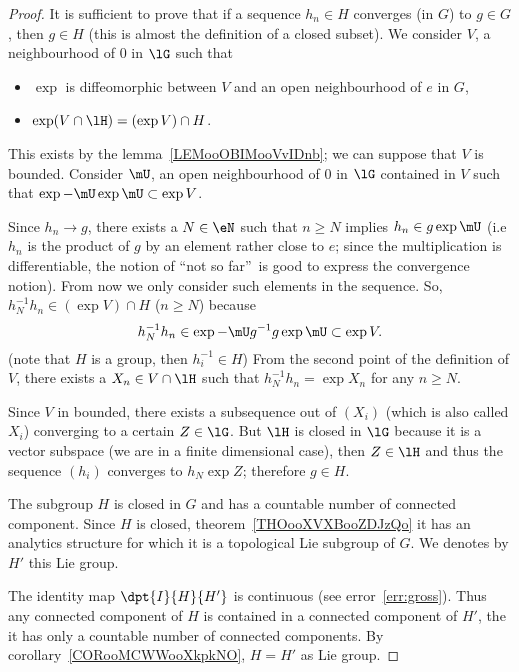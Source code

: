 \begin{proof}
	 It is sufficient to prove that if a sequence $h_n\in H$ converges (in $G$) to $g\in G$, then $g\in H$ (this is almost the definition of a closed subset). We consider $V$, a neighbourhood of $0$ in $\lG$ such that

	\begin{itemize}
		\item $\exp$ is diffeomorphic between $V$ and an open neighbourhood  of $e$ in $G$,
		\item $\exp(V\cap \lH)=(\exp V)\cap H$.
	\end{itemize}
	This exists by the lemma~\ref{LEMooOBIMooVvIDnb}; we can suppose that $V$ is bounded. Consider $\mU$, an open neighbourhood of $0$ in $\lG$ contained in $V$ such that $\exp-\mU\exp\mU\subset\exp V$.

	Since $h_n\to g$, there exists a $N\in\eN$ such that $n\geq N$ implies $h_n\in g\exp\mU$ (i.e $h_n$ is the product of $g$ by an element rather close to $e$; since the multiplication is differentiable, the notion of ``not so far''\ is good to express the convergence notion). From now we only consider such elements in the sequence. So, $h_N^{-1} h_n\in(\exp V)\cap H$ ($n\geq N$) because
	\[
		h_N^{-1} h_n\in\exp-\mU g^{-1} g\exp\mU\subset\exp V.
	\]
	(note that $H$ is a group, then $h_i^{-1}\in H$) From the second point of the definition of $V$, there exists a $X_n\in V\cap\lH$ such that $h^{-1}_N h_n=\exp X_n$ for any $n\geq N$.

	Since $V$ in bounded, there exists a subsequence out of $(X_i)$ (which is also called $X_i$) converging to a certain $Z\in\lG$. But $\lH$ is closed in $\lG$ because it is a vector subspace (we are in a finite dimensional case), then $Z\in\lH$ and thus the sequence $(h_i)$ converges to $h_N\exp Z$; therefore $g\in H$.

	 The subgroup $H$ is closed in $G$ and has a countable number of connected component. Since $H$ is closed, theorem~\ref{THOooXVXBooZDJzQo} it has an analytics structure for which it is a topological Lie subgroup of $G$. We denotes by $H'$ this Lie group.

	The identity map $\dpt{I}{H}{H'}$ is continuous (see error~\ref{err:gross}). Thus any connected component of $H$ is contained in a connected component of $H'$, the it has only a countable number of connected components. By corollary~\ref{CORooMCWWooXkpkNO}, $H=H'$ as Lie group.
\end{proof}

